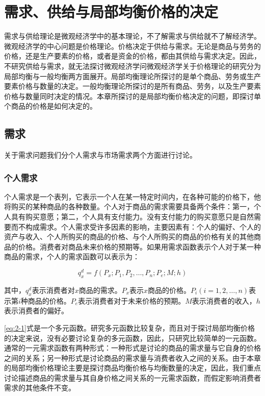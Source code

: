\chapter[需求、供给与局部均衡价格的决定]{需求、供给与局部均衡价格的决定}

需求与供给理论是微观经济学中的基本理论，不了解需求与供给就不了解经济学。微观经济学的中心问题是价格理论。价格决定于供给与需求。无论是商品与劳务的价格，还是生产要素的价格，或者是资金的价格，都由其供给与需求决定。因此，不研究供给与需求，就无法探讨微观经济学问微观经济学关于价格理论的研究分为局部均衡与一般均衡两方面展开。局部均衡理论所探讨的是单个商品、劳务或生产要素价格与数量的决定。一般均衡理论所探讨的是所有商品、劳务，以及生产要素价格与数量同时决定的情况。本章所探讨的是局部均衡价格决定的问题，即探讨单个商品的价格是如何决定的。

\section{需求}

关于需求问题我们分个人需求与市场需求两个方面进行讨论。

\subsection{个人需求}

个人需求是一个表列，它表示一个人在某一特定时间内，在各种可能的价格下，他将购买的某种商品的各种数量。个人对于商品的需求需要具备两个条件：第一，个人具有购买意愿；第二，个人具有支付能力。没有支付能力的购买意愿只是自然需要而不构成需求。个人需求受许多因素的影响，主要因素有：个人的偏好、个人的资产与收入、个人所购买的商品的价格、与个人所购买的商品的价格有关的其他商品的价格。消费者对商品未来价格的预期等。如果用需求函数表示个人对于某一种商品的需求，个人的需求函数可以表示为：

\begin{equation}\label{eq:2-1}
	q_x^d=f(P_x;P_1,P_2,\dots,P_n;P_e;M;h)
\end{equation}

其中，$q_x^d$表示消费者对$x$商品的需求。$P_x$表示$x$商品的价格。$P_i(i=1,2,\dots,n)$表示第$i$种商品的价格。$P_e$表示消费者对于未来价格的预期。$M$表示消费者的收入，$h$表示消费者的偏好。

\eqref{eq:2-1}式是一个多元函数。研究多元函数比较复杂，而且对于探讨局部均衡价格的决定来说，没有必要讨论复杂的多元函数，因此，只研究比较简单的一元函数。通常的一元需求函数有两种形式：一种形式是讨论的商品的需求量与它自身的价格之间的关系；另一种形式是讨论商品的需求量与消费者收入之间的关系。由于本章的局部均衡价格理论主要是探讨商品均衡价格与均衡数量的决定，因此，我们重点讨论描述商品的需求量与其自身价格之间关系的一元需求函数，而假定影响消费者需求的其他条件不变。


